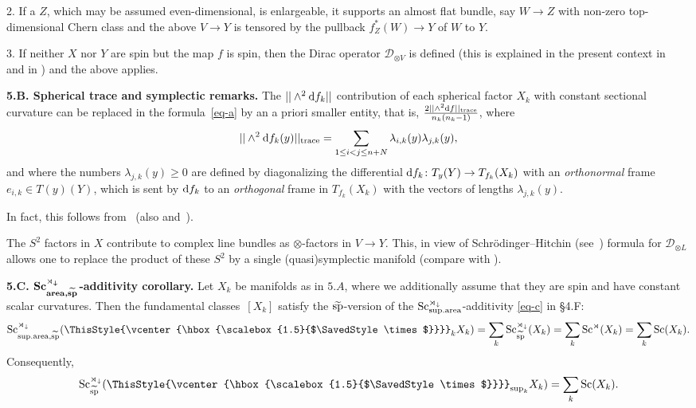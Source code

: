 \documentclass[pdftex]{sigma}
\numberwithin{equation}{section}
\newcommand\bigtimes{\mathbin{\ThisStyle{\vcenter{\hbox{%
\scalebox{1.5}{$\SavedStyle\times$}}}}}}
\begin{document}
2. If a $Z$, which may be assumed even-dimensional, is enlargeable,
it supports an almost flat bundle, say $W \to Z$ with non-zero top-dimensional Chern class and the above $V\to Y$ is tensored by the
pullback $f_Z^\ast(W)\to Y$ of $W$ to $Y$.

3. If neither $X$ nor $Y$ are spin but the map $f$ is spin, then
the Dirac operator $\mathcal D_{\otimes V}$ is defined (this is explained in the present context in~\cite{Mi1995} and in \cite{GS2002}) and the above applies.

\textbf{5.B. Spherical trace and symplectic remarks.} The $ ||\wedge^2{\rm d}f_k||$ contribution of each spherical factor $X_k$ with constant sectional curvature can be replaced
 in the formula~\eqref{eq-a} by an a priori smaller
entity, that is, $ 2||\wedge^2{\rm d}f||_{\rm trace}\over n_k(n_k-1)$,
where
\[
 ||\wedge^2{\rm d}f_k(y)||_{\rm trace}=\sum_{1\leq i<j\leq n+N} \lambda_{i,k}(y) \lambda_{j,k}(y),
 \]
and where the numbers $\lambda_{j,k}(y)\geq 0$ are defined by diagonalizing the
differential ${\rm d}f_k\colon T_y(Y)\to T_{f_k}(X_k)$
with an {\it orthonormal} frame $e_{i,k}\in T(y)(Y)$,
which is sent by ${\rm d}f_k$ to an {\it orthogonal} frame in $T_{f_k}(X_k)$ with the vectors of
lengths $\lambda_{j,k}(y)$.

In fact, this follows from~\cite[formula~(4.6)]{Ll1998} (also \cite{Li2010} and~\cite[\S3.4]{Gr2021}).

The $S^2$ factors in $X$ contribute to complex line bundles as
$\otimes$-factors in $ V\to Y$.
This, in view of Schr\"odinger--Hitchin (see~\cite{Hi1974}) formula for $\mathcal D_{\otimes L}$ allows one to replace the product of these
$S^2$ by a single (quasi)symplectic manifold (compare with \cite[\S2.7 and \S3.4.4(4)]{Gr2021}).

\textbf{5.C. $\boldsymbol{\operatorname{Sc}_{{\rm area},\widetilde {\rm sp}}^{\rtimes_\downarrow}}$-additivity corollary.}
Let $X_k$ be manifolds as in $5.A$, where we additionally assume that they are spin and have constant scalar curvatures.
Then the fundamental classes~$[X_k]$ satisfy the $\widetilde {\rm sp}$-version of the
$\operatorname{Sc}_{{\rm sup.area}}^{\rtimes_\downarrow}$-additivity \eqref{eq-c} in \S4.F:
\[
\operatorname{Sc}_{{\rm sup.area}, \widetilde{\rm sp}}^{\rtimes_\downarrow}( \bigtimes_k X_k)=
\sum_k\operatorname{Sc}_{ \widetilde{\rm sp}}^{\rtimes_\downarrow}(X_k)=
\sum_k\operatorname{Sc}^{\rtimes}(X_k)=\sum_k\operatorname{Sc}(X_k).
\]
Consequently,
\[
\operatorname{Sc}_{\widetilde{\rm sp}}^{\rtimes_\downarrow}( \bigtimes_{\sup_k} X_k)
=\sum_k\operatorname{Sc}(X_k).
\]
\end{document}
